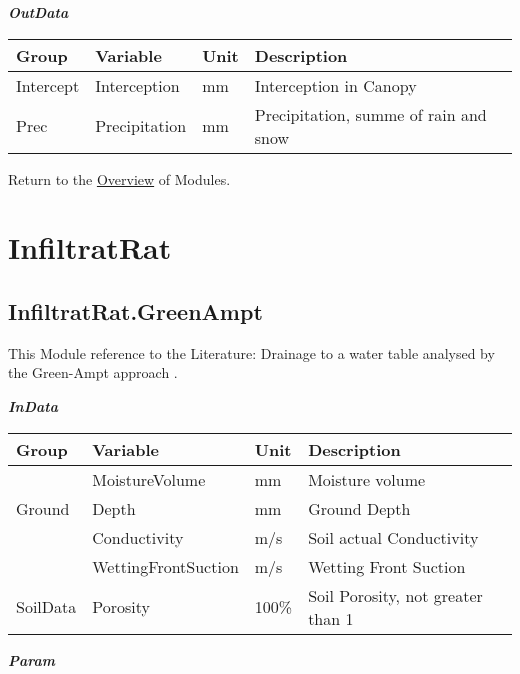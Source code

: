 \documentclass[
]{book}
\begin{document}
\textbf{\emph{OutData}}

\begin{table}[!h]
\centering
\begin{tabular}{l|l|l|l}
\hline
Group & Variable & Unit & Description\\
\hline
Intercept & Interception & mm & Interception in Canopy\\
\cline{1-4}
Prec & Precipitation & mm & Precipitation, summe of rain and snow\\
\hline
\end{tabular}
\end{table}

Return to the \protect\hyperlink{module}{Overview} of Modules.

\hypertarget{InfiltratRat}{%
\section{InfiltratRat}\label{InfiltratRat}}

\hypertarget{InfiltratRat.GreenAmpt}{%
\subsection{InfiltratRat.GreenAmpt}\label{InfiltratRat.GreenAmpt}}

This Module reference to the Literature: Drainage to a water table analysed by the Green-Ampt approach \citep{Youngs.1976}.

\textbf{\emph{InData}}

\begin{table}[!h]
\centering
\begin{tabular}{l|l|l|l}
\hline
Group & Variable & Unit & Description\\
\hline
 & MoistureVolume & mm & Moisture volume\\
\cline{2-4}
\multirow{-2}{*}{\raggedright\arraybackslash Ground} & Depth & mm & Ground Depth\\
\cline{1-4}
 & Conductivity & m/s & Soil actual Conductivity\\
\cline{2-4}
 & WettingFrontSuction & m/s & Wetting Front Suction\\
\cline{2-4}
\multirow{-3}{*}{\raggedright\arraybackslash SoilData} & Porosity & 100\% & Soil Porosity, not greater than 1\\
\hline
\end{tabular}
\end{table}

\textbf{\emph{Param}}
\end{document}
